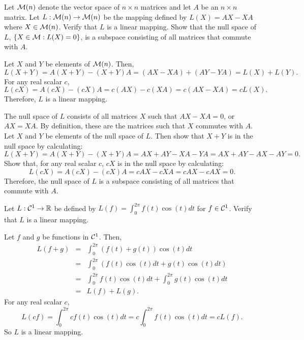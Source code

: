 \documentclass{ximera}
\begin{document}
\begin{exercise} \label{c7.2.4}
Let ${\cal M}(n)$ denote the vector space of $n\times n$
matrices and let $A$ be an $n\times n$ matrix.  Let
$L:{\cal M}(n)\to{\cal M}(n)$ be the mapping defined by
$L(X)=AX-XA$ where $X\in{\cal M}(n)$.  Verify that $L$ is
a linear mapping.  Show that the null space of $L$,
$\{X\in{\cal M}:L(X)=0\}$, is a subspace consisting of all
matrices that commute with $A$.

\begin{solution}

Let $X$ and $Y$ be elements of ${\cal M}(n)$.  Then,
\[ L(X + Y) = A(X + Y) - (X + Y)A = (AX - XA)
+ (AY - YA) = L(X) + L(Y). \]
For any real scalar $c$,
\[ L(cX) = A(cX) - (cX)A = c(AX) - c(XA) = c(AX - XA) = cL(X). \]
Therefore, $L$ is a linear mapping.

\para The null space of $L$ consists of all matrices $X$ such that
$AX - XA = 0$, or $AX = XA$.  By definition, these are the matrices
such that $X$ commutes with $A$.  Let $X$ and $Y$ be elements of
the null space of $L$.  Then show that $X + Y$ is in the null space
by calculating:
\[ L(X + Y) = A(X + Y) - (X + Y)A = AX + AY - XA - YA = AX + AY - AX
- AY = 0. \]
Show that, for any real scalar $c$, $cX$ is in the null space by
calculating:
\[ L(cX) = A(cX) - (cX)A = cAX - cXA = cAX - cAX = 0. \]
Therefore, the null space of $L$ is a subspace consisting of all
matrices that commute with $A$.

\end{solution}
\end{exercise}

\begin{exercise} \label{c7.2.5}
Let $L:{\cal C}^1\to\mbox{$\Bbb{R}$}$ be defined by $L(f) = \int_0^{2\pi}f(t)\cos(t)dt$
for $f\in{\cal C}^1$.  Verify that $L$ is a linear mapping.

\begin{solution}

Let $f$ and $g$ be functions in ${\cal C}^1$.  Then,
\[ \begin{array}{rcl}
 L(f + g) & = & \int_0^{2\pi}(f(t) + g(t))\cos(t)dt \\
& = & \int_0^{2\pi}(f(t)\cos(t)dt + g(t)\cos(t)dt) \\
& = & \int_0^{2\pi}f(t)\cos(t)dt + \int_0^{2\pi}g(t)\cos(t)dt \\
& = & L(f) + L(g). \end{array} \]
For any real scalar $c$,
\[ L(cf) = \int_0^{2\pi}cf(t)\cos(t)dt = c\int_0^{2\pi}f(t)\cos(t)dt
= cL(f). \]
So $L$ is a linear mapping.

\end{solution}
\end{exercise}
\end{document}
